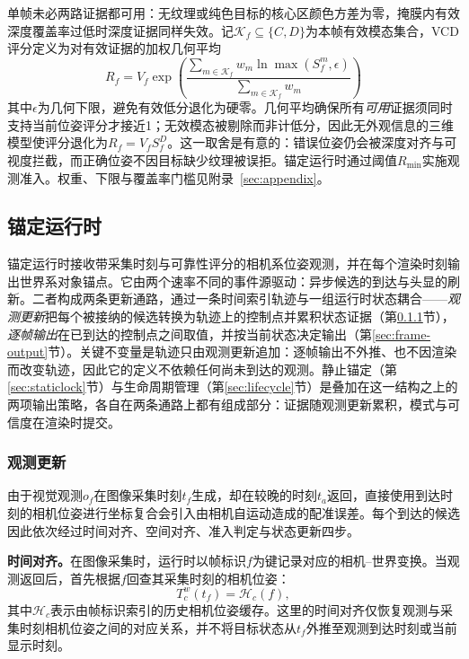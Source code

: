 \documentclass[review]{vgtc}
\begin{document}
单帧未必两路证据都可用：无纹理或纯色目标的核心区颜色方差为零，掩膜内有效深度覆盖率过低时深度证据同样失效。记$\mathcal{K}_f \subseteq \{C, D\}$为本帧有效模态集合，VCD评分定义为对有效证据的加权几何平均
\begin{equation}
R_f = V_f \exp\!\left(\frac{\sum_{m \in \mathcal{K}_f} w_m \ln \max(S_f^{m}, \epsilon)}{\sum_{m \in \mathcal{K}_f} w_m}\right)
\label{eq:vcd}
\end{equation}
其中$\epsilon$为几何下限，避免有效低分退化为硬零。几何平均确保所有\emph{可用}证据须同时支持当前位姿评分才接近1；无效模态被剔除而非计低分，因此无外观信息的三维模型使评分退化为$R_f = V_f S_f^D$。这一取舍是有意的：错误位姿仍会被深度对齐与可视度拦截，而正确位姿不因目标缺少纹理被误拒。锚定运行时通过阈值$R_{\min}$实施观测准入。权重、下限与覆盖率门槛见附录~\ref{sec:appendix}。

\subsection{锚定运行时}\label{sec:anchoring}

锚定运行时接收带采集时刻与可靠性评分的相机系位姿观测，并在每个渲染时刻输出世界系对象锚点。它由两个速率不同的事件源驱动：异步候选的到达与头显的刷新。二者构成两条更新通路，通过一条时间索引轨迹与一组运行时状态耦合——\emph{观测更新}把每个被接纳的候选转换为轨迹上的控制点并累积状态证据（第\ref{sec:obs-update}节），\emph{逐帧输出}在已到达的控制点之间取值，并按当前状态决定输出（第\ref{sec:frame-output}节）。关键不变量是轨迹只由观测更新追加：逐帧输出不外推、也不因渲染而改变轨迹，因此它的定义不依赖任何尚未到达的观测。静止锚定（第\ref{sec:staticlock}节）与生命周期管理（第\ref{sec:lifecycle}节）是叠加在这一结构之上的两项输出策略，各自在两条通路上都有组成部分：证据随观测更新累积，模式与可信度在渲染时提交。

\subsubsection{观测更新}\label{sec:obs-update}

由于视觉观测$o_f$在图像采集时刻$t_f$生成，却在较晚的时刻$t_a$返回，直接使用到达时刻的相机位姿进行坐标复合会引入由相机自运动造成的配准误差。每个到达的候选因此依次经过时间对齐、空间对齐、准入判定与状态更新四步。

\textbf{时间对齐。}在图像采集时，运行时以帧标识$f$为键记录对应的相机--世界变换。当观测返回后，首先根据$f$回查其采集时刻的相机位姿：
\begin{equation}
T_c^w(t_f) = \mathcal{H}_c(f),
\label{eq:temporal-alignment}
\end{equation}
其中$\mathcal{H}_c$表示由帧标识索引的历史相机位姿缓存。这里的时间对齐仅恢复观测与采集时刻相机位姿之间的对应关系，并不将目标状态从$t_f$外推至观测到达时刻或当前显示时刻。
\end{document}
